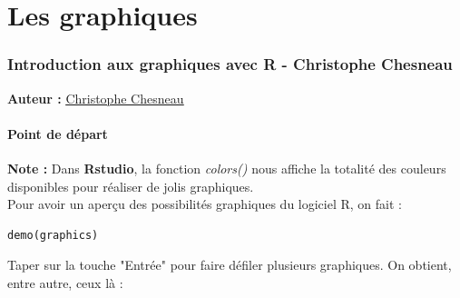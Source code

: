 \part{Les graphiques}

\section{Introduction aux graphiques avec R - Christophe Chesneau}
\textbf{Auteur : }\underline{\href{http://www.math.unicaen.fr/~7Echesneau/}{Christophe Chesneau}}
\subsection{Point de départ}
\textbf{Note : } Dans \textbf{Rstudio}, la fonction \textit{colors()} nous affiche la totalité des couleurs disponibles pour réaliser de jolis graphiques.\newline
\\
Pour avoir un aperçu des possibilités graphiques du logiciel R, on fait :
\begin{lstlisting}[language=html]
demo(graphics)
\end{lstlisting}
Taper sur la touche "Entrée" pour faire défiler plusieurs graphiques.\newline
On obtient, entre autre, ceux là :

